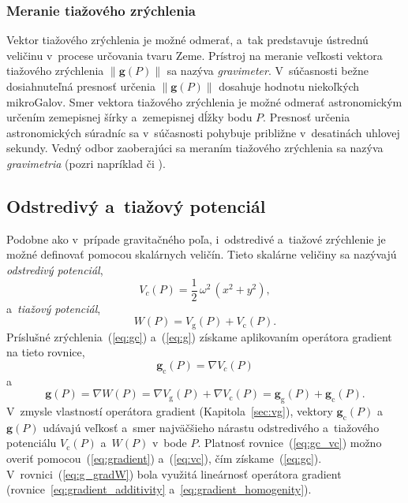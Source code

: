 \documentclass[a4paper,12pt]{book}
\newcommand{\gidx}{\mathrm g}
\newcommand{\cidx}{\mathrm c}
\let\vec\mathbf
\begin{document}
\subsubsection{Meranie tiažového zrýchlenia}

Vektor tiažového zrýchlenia je možné odmerať, a~tak predstavuje ústrednú 
veličinu v~procese určovania tvaru Zeme.  Prístroj na meranie veľkosti vektora 
tiažového zrýchlenia $\| \vec g(P) \|$ sa nazýva \emph{gravimeter}.  
V~súčasnosti bežne dosiahnuteľná presnosť určenia $\| \vec g(P) \|$ dosahuje 
hodnotu niekoľkých mikroGalov.  Smer vektora tiažového zrýchlenia je možné 
odmerať astronomickým určením zemepisnej šírky a~zemepisnej dĺžky bodu $P$.  
Presnosť určenia astronomických súradníc sa v~súčasnosti pohybuje približne 
v~desatinách uhlovej sekundy.    Vedný odbor zaoberajúci sa meraním tiažového 
zrýchlenia sa nazýva \emph{gravimetria} (pozri napríklad 
\cite{Torge1989,Rozimant1994} či \cite{Janak2010}).






\subsection{Odstredivý a~tiažový potenciál}
\label{sec:centrifugal_and_gravity_potential}

Podobne ako v~prípade gravitačného poľa, i~odstredivé a~tiažové zrýchlenie je
možné definovať pomocou skalárnych veličín.  Tieto skalárne veličiny sa
nazývajú \emph{odstredivý potenciál},
%
\begin{equation}
\label{eq:vc}
V_c(P) = \frac{1}{2} \, \omega^2 \, (x^2 + y^2){,}
\end{equation}
%
a~\emph{tiažový potenciál},
%
\begin{equation}
\label{eq:w}
W(P) = V_\gidx(P) + V_\cidx(P){.}
\end{equation}
%
Príslušné zrýchlenia~(\ref{eq:gc}) a~(\ref{eq:g}) získame aplikovaním operátora
gradient na tieto rovnice,
%
\begin{equation}
\label{eq:gc_vc}
\vec g_\cidx(P) = \nabla V_c(P)
\end{equation}
%
a
%
\begin{equation}
\label{eq:g_gradW}
\vec g(P) = \nabla W(P) = \nabla V_\gidx(P) + \nabla V_\cidx(P) = \vec
g_\gidx(P) + \vec g_\cidx(P){.}
\end{equation}
%
V~zmysle vlastností operátora gradient (Kapitola~\ref{sec:vg}), vektory $\vec
g_\cidx(P)$ a~$\vec g(P)$ udávajú veľkosť a~smer najväčšieho nárastu
odstredivého a~tiažového potenciálu $V_\cidx(P)$ a~$W(P)$ v~bode $P$.  Platnosť
rovnice~(\ref{eq:gc_vc}) možno overiť pomocou~(\ref{eq:gradient})
a~(\ref{eq:vc}), čím získame~(\ref{eq:gc}).  V~rovnici~(\ref{eq:g_gradW}) bola
využitá lineárnosť operátora gradient (rovnice~\ref{eq:gradient_additivity} 
a~\ref{eq:gradient_homogenity}).
\end{document}
